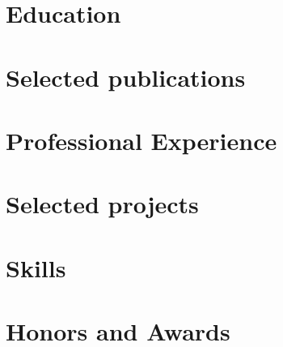\documentclass[letter,10pt]{article}
\begin{document}
\thispagestyle{firstpage}
\section{Education}


%

\section{Selected publications}



\section{Professional Experience}




\section{Selected projects}


\section{Skills}

\newpage
\thispagestyle{otherpages}

\section{Honors and Awards}

\end{document}
